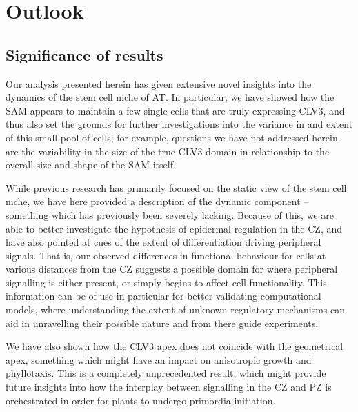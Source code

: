 \chapter{Outlook}

\ifpdf
\graphicspath{{Chapter5/Figs/Raster/}{Chapter5/Figs/PDF/}{Chapter5/Figs/}}
\else
\graphicspath{{Chapter5/Figs/Vector/}{Chapter5/Figs/}}
\fi

\section{Significance of results}
Our analysis presented herein has given extensive novel insights into the dynamics of
the stem cell niche of AT. In particular, we have showed how the SAM appears to
maintain a few single cells that are truly expressing CLV3, and thus also set
the grounds for further investigations into the variance in and extent of this small
pool of cells; for example, questions we have not addressed herein are the
variability in the size of the true CLV3 domain in relationship to the overall
size and shape of the SAM itself. 

While previous research has primarily focused on the static view of the stem
cell niche, we have here provided a description of the dynamic component --
something which has previously been severely lacking. Because of this, we are
able to better investigate the hypothesis of epidermal regulation in the
CZ, and have also pointed at cues of the extent of differentiation driving peripheral
signals. That is, our observed differences in functional behaviour for cells at
various distances from the CZ suggests a possible domain for where peripheral
signalling is either present, or simply begins to affect cell functionality.
This information can be of use in particular for better validating computational
models, where
understanding the extent of unknown regulatory mechanisms can aid in unravelling
their possible nature and from there guide experiments.

% 
We have also shown how the CLV3 apex does not coincide with the geometrical
apex, something which might have an impact on anisotropic growth and
phyllotaxis. This is a completely unprecedented result, which might provide
future insights into how the interplay between signalling in the CZ and PZ is orchestrated
in order for plants to undergo primordia initiation.

